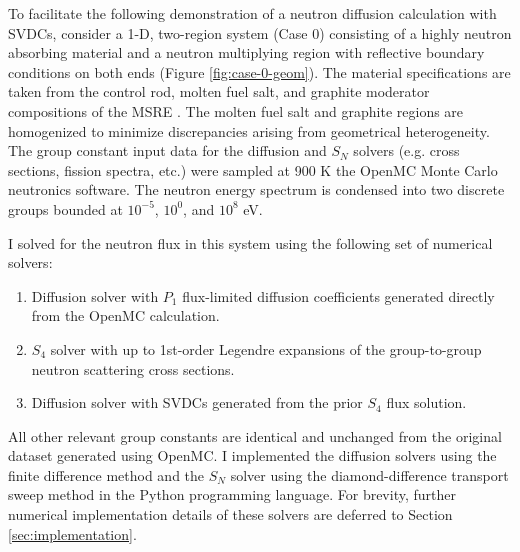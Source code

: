 To facilitate the following demonstration of a neutron diffusion calculation with \glspl{SVDC},
consider a 1-D, two-region system (Case 0) consisting of a highly neutron absorbing material and a
neutron multiplying region with reflective boundary conditions on both ends (Figure
\ref{fig:case-0-geom}). The material specifications are taken from the control rod, molten fuel
salt, and graphite moderator compositions of the \gls{MSRE} \cite{robertson_msre_1965}. The molten
fuel salt and graphite regions are homogenized to minimize discrepancies arising from geometrical
heterogeneity. The group constant input data for the diffusion and $S_N$ solvers (e.g. cross
sections, fission spectra, etc.) were sampled at 900 K the OpenMC Monte Carlo neutronics software.
The neutron energy spectrum is condensed into two discrete groups bounded at $10^{-5}$, $10^0$, and
$10^8$ eV.

I solved for the neutron flux in this system using the following set of numerical solvers:
%
\begin{enumerate}
  \item Diffusion solver with $P_1$ flux-limited diffusion coefficients generated directly from the
    OpenMC calculation.
  \item $S_4$ solver with up to 1st-order Legendre expansions of the group-to-group neutron
    scattering cross sections.
  \item Diffusion solver with \glspl{SVDC} generated from the prior $S_4$ flux solution.
\end{enumerate}
%
All other relevant group constants are identical and unchanged from the original dataset generated
using OpenMC. I implemented the diffusion solvers using the finite difference method and the $S_N$
solver using the diamond-difference transport sweep method in the Python programming language. For
brevity, further numerical implementation details of these solvers are deferred to Section
\ref{sec:implementation}.

